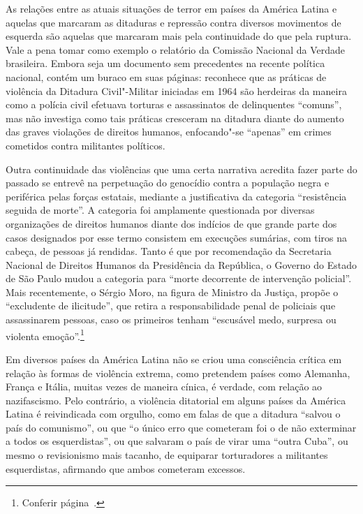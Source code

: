 As relações entre as atuais situações de terror em países da América
Latina e aquelas que marcaram as ditaduras e repressão contra diversos movimentos de
esquerda são aquelas que marcaram mais pela continuidade do que pela ruptura. Vale a
pena tomar como exemplo o relatório da Comissão Nacional da Verdade
brasileira. Embora seja um documento sem precedentes na recente política
nacional, contém um buraco em suas páginas: reconhece que as práticas de
violência da Ditadura Civil"-Militar iniciadas em 1964 são herdeiras da
maneira como a polícia civil efetuava torturas e assassinatos de
delinquentes ``comuns'', mas não investiga como tais práticas cresceram
na ditadura diante do aumento das graves violações de direitos humanos,
enfocando"-se ``apenas'' em crimes cometidos contra militantes políticos.

Outra continuidade das violências que uma certa narrativa acredita fazer
parte do passado se entrevê na perpetuação do genocídio contra a
população negra e periférica pelas forças estatais, mediante a
justificativa da categoria ``resistência seguida de morte''. A categoria
foi amplamente questionada por diversas organizações de direitos humanos
diante dos indícios de que grande parte dos casos designados por esse
termo consistem em execuções sumárias, com tiros na cabeça, de pessoas
já rendidas. Tanto é que por recomendação da Secretaria Nacional de
Direitos Humanos da Presidência da República, o Governo do Estado de São
Paulo mudou a categoria para ``morte decorrente de intervenção
policial''. Mais recentemente, o Sérgio Moro, na figura de Ministro da Justiça, propõe o ``excludente de ilicitude'', que retira a responsabilidade penal de policiais que assassinarem pessoas, caso os primeiros tenham ``escusável medo, surpresa ou violenta emoção''.\footnote{Conferir página~\pageref{moro}.}

Em diversos países da América Latina não se criou uma consciência
crítica em relação às formas de violência extrema, como pretendem países
como Alemanha, França e Itália, muitas vezes de maneira cínica, é
verdade, com relação ao nazifascismo. Pelo contrário, a violência
ditatorial em alguns países da América Latina é reivindicada com
orgulho, como em falas de que a ditadura ``salvou o país do comunismo'',
ou que ``o único erro que cometeram foi o de não exterminar a todos os
esquerdistas'', ou que salvaram o país de virar uma ``outra Cuba'', ou
mesmo o revisionismo mais tacanho, de equiparar torturadores a
militantes esquerdistas, afirmando que ambos cometeram excessos.

